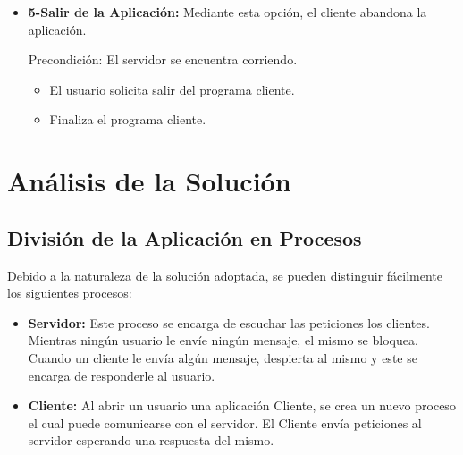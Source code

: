 \documentclass[a4paper,10pt]{article}
\begin{document}
\begin{itemize}
                \begin{itemize}
                   \item El usuario solicita al programa cliente la eliminaci\'on de un registro. 
                   \item El programa cliente solicita el n\'umero de registro que se desea eliminar. 
                  \item El programa cliente envía la petici\'on de eliminaci\'on al servidor. 
                   \item El servidor realiza la petici\'on y env\'ia el resultado al cliente. 
			\item El cliente recibe la respuesta del servidor y la muestra al usuario (E1).
			\item El cliente regresa al men\'u principal.
                \end{itemize}
               E1) El n\'umero de registro ingresado no existe. 
		\begin{itemize}
			\item El cliente notifica el error al usuario.
			\item El cliente regresa al men\'u principal.
		\end{itemize}
		\item \textbf{5-Salir de la Aplicaci\'on:} Mediante esta opci\'on, el cliente abandona la aplicaci\'on.

                Precondici\'on: El servidor se encuentra corriendo. 
                
                \begin{itemize}
                    \item El usuario solicita salir del programa cliente.
                    \item Finaliza el programa cliente.
                \end{itemize}
			\end{itemize}

	\section{An\'alisis de la Soluci\'on}
		\subsection{Divisi\'on de la Aplicaci\'on en Procesos}
			Debido a la naturaleza de la soluci\'on adoptada, se pueden distinguir f\'acilmente los siguientes procesos:

			\begin{itemize}
				\item \textbf{Servidor:} Este proceso se encarga de escuchar las peticiones los clientes. Mientras ning\'un usuario le env\'ie ning\'un 
				mensaje, el mismo se bloquea. Cuando un cliente le env\'ia alg\'un mensaje, despierta al mismo y este se encarga de responderle al 
				usuario.
				\item \textbf{Cliente:} Al abrir un usuario una aplicaci\'on Cliente, se crea un nuevo proceso el cual puede comunicarse con el servidor.
				El Cliente env\'ia peticiones al servidor esperando una respuesta del mismo.
			\end{itemize}
\end{document}

